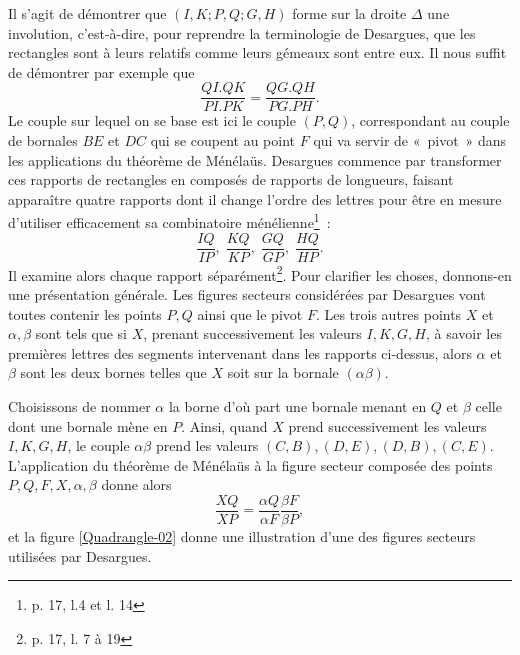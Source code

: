 \documentclass[12pt, a4paper]{article}
\begin{document}
Il s'agit de démontrer que $(I,K; P,Q;G,H)$ forme sur la droite $\Delta$ une involution, c'est-à-dire, pour reprendre la terminologie de Desargues, que les rectangles sont à leurs relatifs comme leurs gémeaux sont entre eux. Il nous suffit de démontrer par exemple que
\[
\frac{QI.QK}{PI.PK}=\frac{QG.QH}{PG.PH}.
\]
Le couple sur lequel on se base est ici le couple $(P,Q)$, correspondant au couple de bornales $BE$ et $DC$ qui se coupent au point $F$ qui va servir de «~pivot~» dans les applications du théorème de Ménélaüs. Desargues commence par transformer ces rapports de rectangles en composés de rapports de longueurs, faisant apparaître quatre rapports dont il change l'ordre des lettres pour être en mesure d'utiliser efficacement sa combinatoire ménélienne\footnote{p. 17, l.4 et l. 14}~:~
\[
\frac{IQ}{IP}, \;\frac{KQ}{KP},\;\frac{GQ}{GP},\; \frac{HQ}{HP}.
\]
Il examine alors chaque rapport séparément\footnote{p. 17, l. 7 à 19}. Pour clarifier les choses, donnons-en une présentation générale. Les figures secteurs considérées par Desargues vont toutes contenir les points $P,Q$ ainsi que le pivot $F$. Les trois autres points $X$ et $\alpha,\beta$ sont tels que si $X$, prenant successivement les valeurs $I,K,G,H$, à savoir les premières lettres des segments intervenant dans les rapports ci-dessus, alors $\alpha$ et $\beta$ sont les deux bornes telles que $X$ soit sur la bornale $(\alpha\beta)$. 

Choisissons de nommer $\alpha$ la borne d'où part une bornale menant en $Q$ et $\beta$ celle dont une bornale mène en $P$. Ainsi, quand $X$ prend successivement les valeurs $I,K,G,H$, le couple $\alpha\beta$ prend les valeurs $(C,B), (D,E), (D,B), (C,E)$. L'application du théorème de Ménélaüs à la figure secteur composée des points $P,Q,F,X,\alpha,\beta$ donne alors
\[
\frac{XQ}{XP}=\frac{\alpha Q}{\alpha F}\frac{\beta F}{\beta P},
\]
et la figure \ref{Quadrangle-02} donne une illustration d'une des figures secteurs utilisées par Desargues.
\end{document}
